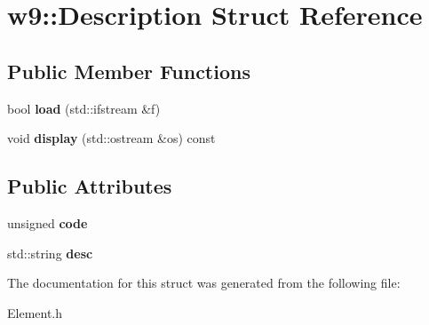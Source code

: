 \hypertarget{structw9_1_1Description}{}\section{w9\+:\+:Description Struct Reference}
\label{structw9_1_1Description}
\subsection*{Public Member Functions}
\begin{DoxyCompactItemize}
\item 
\mbox{\label{structw9_1_1Description_aead17acb898890850d6f44a32d64cb32}} 
bool {\bfseries load} (std\+::ifstream \&f)
\item 
\mbox{\label{structw9_1_1Description_a264a7fe0fed6622ca71df3501d8b0398}} 
void {\bfseries display} (std\+::ostream \&os) const
\end{DoxyCompactItemize}
\subsection*{Public Attributes}
\begin{DoxyCompactItemize}
\item 
\mbox{\label{structw9_1_1Description_aed4e5192c3e67ebdcad04bbe8f3b0d57}} 
unsigned {\bfseries code}
\item 
\mbox{\label{structw9_1_1Description_aee388dd62a6cb609656ee22edbdab64b}} 
std\+::string {\bfseries desc}
\end{DoxyCompactItemize}


The documentation for this struct was generated from the following file\+:\begin{DoxyCompactItemize}
\item 
Element.\+h\end{DoxyCompactItemize}
